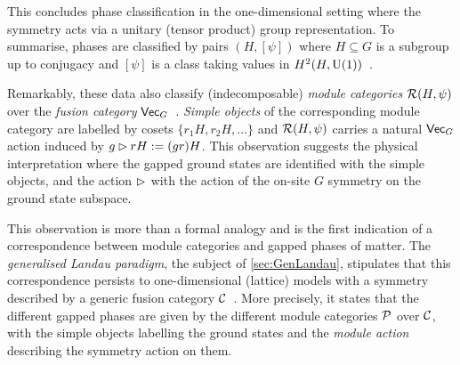 \bigskip\noindent This concludes phase classification in the one-dimensional setting where the symmetry acts via a unitary (tensor product) group representation. To summarise, phases are classified by pairs $(H,[\psi])$ where $H\subseteq G$ is a subgroup up to conjugacy and $[\psi]$ is a class taking values in $H^2(H,{\rm U}(1))$~\cite{Chen2010,Schuch2011}.

Remarkably, these data also classify (indecomposable) \emph{module categories} $\mathcal{R}(H,\psi)$ over the \emph{fusion category} $\mathsf{Vec}_G$~\cite{Ostrik2001,Etingof2015}. \emph{Simple objects} of the corresponding module category are labelled by cosets $\{r_1H,r_2H,\dots\}$ and $\mathcal{R}(H,\psi)$ carries a natural $\mathsf{Vec}_G$ action induced by $g\rhd rH:= (gr)H$. This observation suggests the physical interpretation where the gapped ground states are identified with the simple objects, and the action $\rhd$ with the action of the on-site $G$ symmetry on the ground state subspace. 

This observation is more than a formal analogy and is the first indication of a correspondence between module categories and gapped phases of matter. The \emph{generalised Landau paradigm}, the subject of \cref{sec:GenLandau}, stipulates that this correspondence persists to one-dimensional (lattice) models with a symmetry described by a generic fusion category $\mathcal{C}$~\cite{Thorngren2019,GarreRubio2022,Bhardwaj2023,Lootens2024}. More precisely, it states that the different gapped phases are given by the different module categories $\mathcal{P}$ over $\mathcal{C}$, with the simple objects labelling the ground states and the \emph{module action} describing the symmetry action on them.